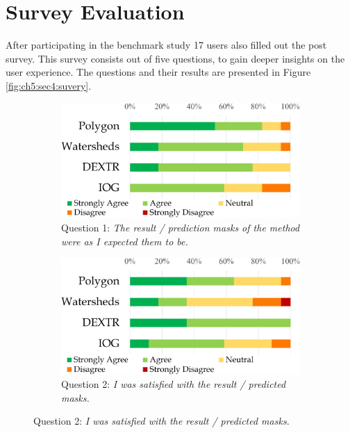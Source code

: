 
\section{Survey Evaluation}\label{ord:ch5:sec4_survey}
After participating in the benchmark study 17 users also filled out the post survey.
This survey consists out of five questions, to gain deeper insights on the user experience.
The questions and their results are presented in Figure \ref{fig:ch5:sec4:suvery}.

\begin{figure} [h!]
	\centering
	\begin{subfigure}[t]{0.48\textwidth}
		\centering
		\includegraphics[width=\textwidth]{figures/chap54_q1.png}
		\caption{
			Question 1: \textit{The result / prediction masks of the method were as I expected them to be.}
		} \label{fig:ch5:sec4:q1}
	\end{subfigure}
	\hfill
	\begin{subfigure}[t]{0.48\textwidth}
		\centering
		\includegraphics[width=\textwidth]{figures/chap54_q2.png}
		\caption{
			Question 2: \textit{I was satisfied with the result / predicted masks.}
}
\end{subfigure}
\end{figure}
